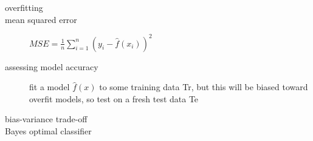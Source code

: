 \documentclass[12pt]{article}
\begin{document}
\begin{description}
    \item[overfitting]

    \item[mean squared error] $MSE = \frac{1}{n}\sum\limits_{i=1}^n (y_i -
    	\hat{f}(x_i))^2$

    \item[assessing model accuracy] fit a model $\hat{f}(x)$ to some training
    	data Tr, but this will be biased toward overfit models, so test on
    	a fresh test data Te

    \item[bias-variance trade-off]
    
    \item[Bayes optimal classifier]
    
\end{description}
\end{document}
